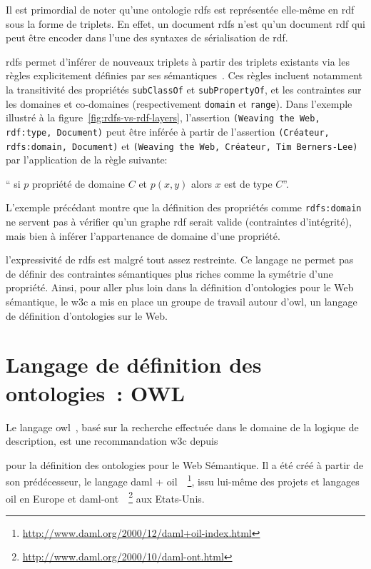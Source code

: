 Il est primordial de noter qu'une ontologie \acrshort{rdfs} est
représentée elle-même en \acrshort{rdf} sous la forme de triplets. En
effet, un document \acrshort{rdfs} n'est qu'un document \acrshort{rdf}
qui peut être encoder dans l'une des syntaxes de sérialisation de
\acrshort{rdf}.\medskip

\acrshort{rdfs} permet d'inférer de nouveaux triplets à partir des
triplets existants via les règles explicitement définies par ses
sémantiques~\cite{hayes2004rdf}. Ces règles incluent notamment la
transitivité des propriétés \texttt{subClassOf} et
\texttt{subPropertyOf}, et les contraintes sur les domaines et
co-domaines (respectivement \texttt{domain} et \texttt{range}). Dans
l'exemple illustré à la figure~\ref{fig:rdfs-vs-rdf-layers},
l'assertion \texttt{(Weaving the Web, rdf:type, Document)} peut être
inférée à partir de l'assertion \texttt{(Créateur, rdfs:domain,
  Document)} et \texttt{(Weaving the Web, Créateur, Tim Berners-Lee)}
par l'application de la règle suivante:\smallskip

`` si $p$ propriété de domaine $C$ et $p(x, y)$ alors $x$ est de type
$C$''.\medskip

L'exemple précédant montre que la définition des propriétés comme
\texttt{rdfs:domain} ne servent pas à vérifier qu'un graphe
\acrshort{rdf} serait valide (contraintes d'intégrité), mais bien à
inférer l'appartenance de domaine d'une propriété.\medskip

l'expressivité de \acrshort{rdfs} est malgré tout assez restreinte. Ce
langage ne permet pas de définir des contraintes sémantiques plus
riches comme la symétrie d'une propriété. Ainsi, pour aller plus loin
dans la définition d'ontologies pour le Web sémantique, le
\acrshort{w3c} a mis en place un groupe de travail autour
d'\acrshort{owl}, un langage de définition d'ontologies sur le
Web.\medskip

\section{Langage de définition des ontologies~: OWL}
\label{sec:semantic-web-owl2}

Le langage \acrshort{owl}~\cite{mcguinness2004owl}, basé sur la
recherche effectuée dans le domaine de la logique de description, est
une recommandation \acrshort{w3c} depuis \date{2004} pour la
définition des ontologies pour le Web Sémantique. Il a été créé à
partir de son prédécesseur, le langage \acrshort{daml} +
\acrshort{oil}~\cite{
  horrocks2002daml+oil}~\footnote{\url{http://www.daml.org/2000/12/daml+oil-index.html}},
issu lui-même des projets et langages
\acrshort{oil}\cite{horrocks2000ontology} en Europe et
\acrshort{daml-ont}~\cite{mcguinness2003daml}~\footnote{\url{http://www.daml.org/2000/10/daml-ont.html}}
aux Etats-Unis.\medskip

